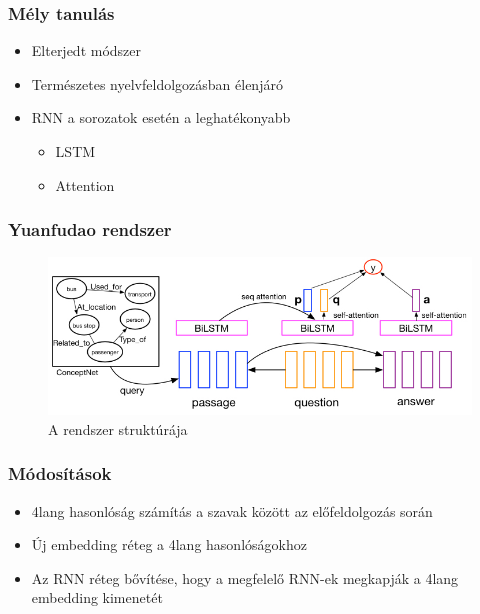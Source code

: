 \documentclass[bigger]{beamer}
\begin{document}

\begin{frame}
	\frametitle{M\'ely tanul\'as}
	\begin{itemize}
		\pause \item Elterjedt m\'odszer
		\pause \item Term\'eszetes nyelvfeldolgoz\'asban \'elenj\'ar\'o
		\pause \item RNN a sorozatok eset\'en a leghat\'ekonyabb
		\begin{itemize}
			\pause \item LSTM
			\pause \item Attention
		\end{itemize}
	\end{itemize}
\end{frame}


\begin{frame}
	\frametitle{Yuanfudao rendszer}
	\begin{figure}[h!]
		\centering
		\includegraphics[scale=0.4]{pics/TriAN.jpg}
		\caption{A rendszer strukt\'ur\'aja}
		\label{fig:dnn}
	\end{figure}
\end{frame}
\begin{frame}
	\frametitle{M\'odos\'it\'asok}
	\begin{itemize}
		\pause \item 4lang hasonl\'os\'ag sz\'am\'it\'as a szavak k\"oz\"ott az el\H{o}feldolgoz\'as sor\'an
		\pause \item \'Uj embedding r\'eteg a 4lang hasonl\'os\'agokhoz
		\pause \item Az RNN r\'eteg b\H{o}v\'it\'ese, hogy a megfelel\H{o} RNN-ek megkapj\'ak a 4lang embedding kimenet\'et
	\end{itemize}
\end{frame}


\end{document}
